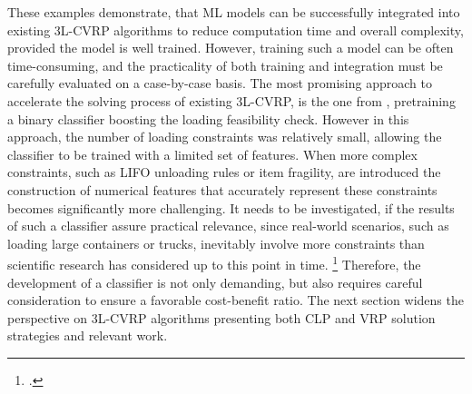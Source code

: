 \parbreak

These examples demonstrate, that \gls{ML} models can be successfully integrated into existing \gls{3L-CVRP}
algorithms to reduce computation time and overall complexity, provided the model is well trained.
However, training such a model can be often time-consuming, and the practicality of both training and
integration must be carefully evaluated on a case-by-case basis. The most promising approach to
accelerate the solving process of existing \gls{3L-CVRP}, is the one from \cite{zhang_learning-based_2022},
pretraining a binary classifier boosting the loading feasibility check. However in this approach,
the number of loading constraints was relatively small, allowing the classifier
to be trained with a limited set of features. When more complex constraints, such as
\gls{LIFO} unloading rules or item fragility, are introduced the construction of numerical features that accurately
represent these constraints becomes significantly more challenging. It needs to be investigated, if
the results of such a classifier assure practical relevance, since real-world
scenarios, such as loading large containers or trucks, inevitably involve
more constraints than scientific research has considered up to this point in time. \footcite[cf.][pp. 1--2]{bischoff_issues_1995}
Therefore, the development of a classifier is not only demanding, but also
requires careful consideration to ensure a favorable cost-benefit ratio. The next section widens the perspective
on \gls{3L-CVRP} algorithms presenting both \gls{CLP} and \gls{VRP} solution strategies and relevant work.

